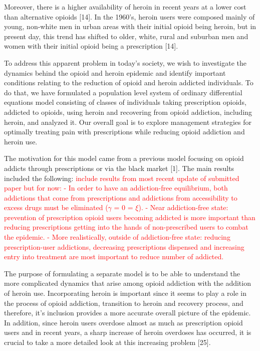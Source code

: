 \documentclass[12pt]{article}
\begin{document}
Moreover, there is a higher availability of heroin in recent years at a lower cost than alternative opioids [14]. In the 1960's, heroin users were composed mainly of young, non-white men in urban areas with their initial opioid being heroin, but in present day, this trend has shifted to older, white, rural and suburban men and women with their initial opioid being a prescription [14]. 

To address this apparent problem in today's society, we wish to investigate the dynamics behind the opioid and heroin epidemic and identify important conditions relating to the reduction of opioid and heroin addicted individuals. To do that, we have formulated a population level system of ordinary differential equations model consisting of classes of individuals taking prescription opioids, addicted to opioids, using heroin and recovering from opioid addiction, including heroin, and analyzed it. Our overall goal is to explore management strategies for optimally treating pain with prescriptions while reducing opioid addiction and heroin use. 

The motivation for this model came from a previous model focusing on opioid addicts through prescriptions or via the black market [1]. The main results included the following: \textcolor{red}{include results from most recent update of submitted paper but for now: 
- In order to have an addiction-free equilibrium, both addictions that come from prescriptions and addictions from accessibility to excess drugs must be eliminated ($\gamma$ = 0 = $\xi$).
- Near addiction-free state: prevention of prescription opioid users becoming addicted is more important than reducing prescriptions getting into the hands of non-prescribed users to combat the epidemic.
- More realistically, outside of addiction-free state: reducing prescription-user addictions, decreasing prescriptions dispensed and increasing entry into treatment are most important to reduce number of addicted.} 

The purpose of formulating a separate model is to be able to understand the more complicated dynamics that arise among opioid addiction with the addition of heroin use. Incorporating heroin is important since it seems to play a role in the process of opioid  addiction, transition to heroin and recovery process, and therefore, it's inclusion provides a more accurate overall picture of the epidemic. In addition, since heroin users overdose almost as much as prescription opioid users and in recent years, a sharp increase of heroin overdoses has occurred, it is crucial to take a more detailed look at this increasing problem [25]. 
\end{document}
